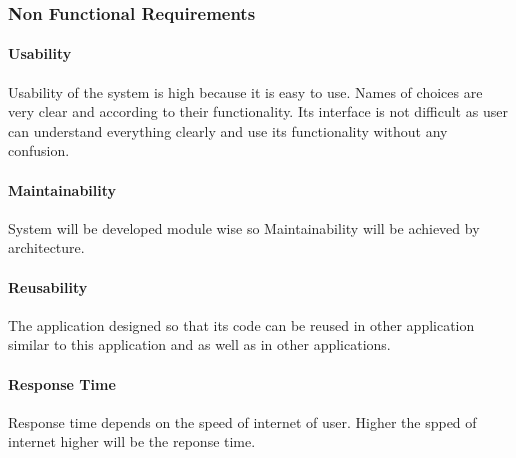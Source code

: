 \subsubsection{Non Functional Requirements}
\paragraph{Usability}
Usability of the system is high because it is easy to use. Names of choices are very clear and according to their functionality. Its interface is not difficult as user can understand
everything clearly and use its functionality without any confusion.  
\paragraph{Maintainability}
System will be developed module wise so Maintainability will be achieved by architecture.
\paragraph{Reusability}
The application designed so that its code can be reused in other application similar to this application and as well as in other applications.
\paragraph{Response Time}
Response time depends on the speed of internet of user. Higher the spped of internet higher will be the reponse time.


